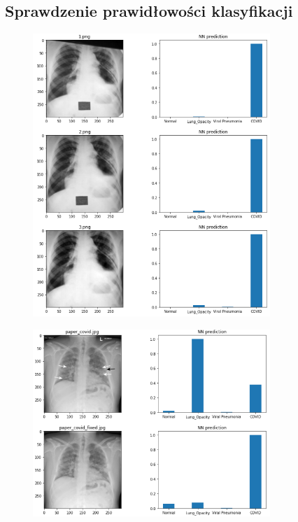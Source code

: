\documentclass{article}
\begin{document}
\subsection{Sprawdzenie prawidłowości klasyfikacji}

\begin{figure}[H]
	\centering
	\includegraphics[width=0.8\textwidth,keepaspectratio=true]{fixing_image_exp}
	\caption{}
	\label{}
\end{figure}

\begin{figure}[H]
	\centering
	\includegraphics[width=0.8\textwidth,keepaspectratio=true]{paper_covid_exp}
	\caption{}
	\label{}
\end{figure}
\end{document}
